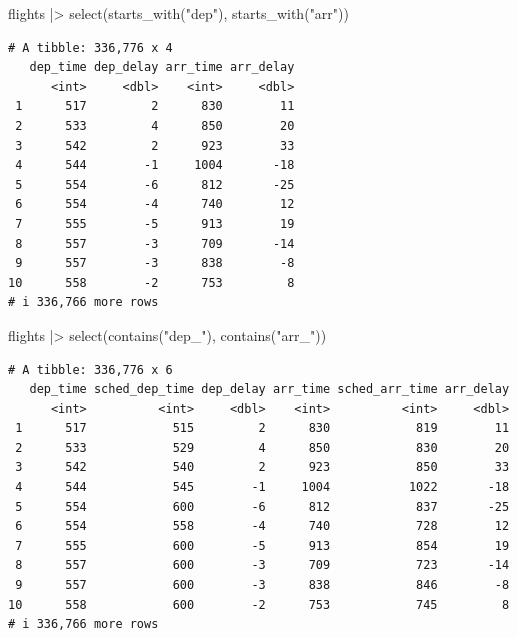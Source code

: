 \documentclass[
  letterpaper,
  DIV=11,
  numbers=noendperiod]{scrreprt}
\newenvironment{Shaded}{\begin{snugshade}}{\end{snugshade}}
\newcommand{\FunctionTok}[1]{\textcolor[rgb]{0.28,0.35,0.67}{#1}}
\newcommand{\NormalTok}[1]{\textcolor[rgb]{0.00,0.23,0.31}{#1}}
\newcommand{\SpecialCharTok}[1]{\textcolor[rgb]{0.37,0.37,0.37}{#1}}
\newcommand{\StringTok}[1]{\textcolor[rgb]{0.13,0.47,0.30}{#1}}
\begin{document}
\begin{Shaded}
\begin{Highlighting}[]
\NormalTok{flights }\SpecialCharTok{|\textgreater{}}
  \FunctionTok{select}\NormalTok{(}\FunctionTok{starts\_with}\NormalTok{(}\StringTok{"dep"}\NormalTok{), }\FunctionTok{starts\_with}\NormalTok{(}\StringTok{"arr"}\NormalTok{))}
\end{Highlighting}
\end{Shaded}

\begin{verbatim}
# A tibble: 336,776 x 4
   dep_time dep_delay arr_time arr_delay
      <int>     <dbl>    <int>     <dbl>
 1      517         2      830        11
 2      533         4      850        20
 3      542         2      923        33
 4      544        -1     1004       -18
 5      554        -6      812       -25
 6      554        -4      740        12
 7      555        -5      913        19
 8      557        -3      709       -14
 9      557        -3      838        -8
10      558        -2      753         8
# i 336,766 more rows
\end{verbatim}

\begin{Shaded}
\begin{Highlighting}[]
\NormalTok{flights }\SpecialCharTok{|\textgreater{}}
  \FunctionTok{select}\NormalTok{(}\FunctionTok{contains}\NormalTok{(}\StringTok{"dep\_"}\NormalTok{), }\FunctionTok{contains}\NormalTok{(}\StringTok{"arr\_"}\NormalTok{))}
\end{Highlighting}
\end{Shaded}

\begin{verbatim}
# A tibble: 336,776 x 6
   dep_time sched_dep_time dep_delay arr_time sched_arr_time arr_delay
      <int>          <int>     <dbl>    <int>          <int>     <dbl>
 1      517            515         2      830            819        11
 2      533            529         4      850            830        20
 3      542            540         2      923            850        33
 4      544            545        -1     1004           1022       -18
 5      554            600        -6      812            837       -25
 6      554            558        -4      740            728        12
 7      555            600        -5      913            854        19
 8      557            600        -3      709            723       -14
 9      557            600        -3      838            846        -8
10      558            600        -2      753            745         8
# i 336,766 more rows
\end{verbatim}
\end{document}
